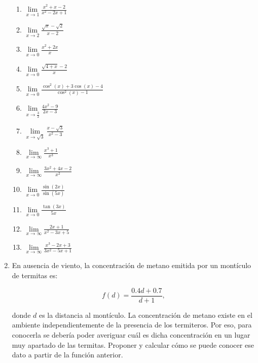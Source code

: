 \documentclass[12pt]{article}
\theoremstyle{definition}
\begin{document}
\begin{enumerate}
\begin{multicols}{3}
\begin{enumerate}
\item $\lim\limits_{x \to 1} \frac{x^2 + x - 2}{x^2 - 2x + 1}$
\item $\lim\limits_{x \to 2} \frac{\sqrt{x} - \sqrt{2}}{x - 2}$
\item $\lim\limits_{x \to 0} \frac{x^2 + 2x}{x}$
\item $\lim\limits_{x \to 0} \frac{\sqrt{4 + x} - 2}{x}$
\item $\lim\limits_{x \to 0} \frac{\cos^2(x) + 3\cos(x) - 4}{\cos^2(x) - 1}$
\item $\lim\limits_{x \to \frac{3}{2}} \frac{4x^2 - 9}{2x - 3}$
\item $\lim\limits_{x \to \sqrt{3}} \frac{x - \sqrt{3}}{x^2 - 3}$
\item $\lim\limits_{x \to \infty} \frac{x^3 + 1}{x^3}$
\item $\lim\limits_{x \to \infty} \frac{3x^2 + 4x - 2}{x^2}$
\item $\lim\limits_{x \to 0} \frac{\sin(2x)}{\sin(5x)}$
\item $\lim\limits_{x \to 0} \frac{\tan(3x)}{5x}$
\item $\lim\limits_{x \to \infty} \frac{2x + 1}{x^2 - 3x + 5}$
\item $\lim\limits_{x \to \infty} \frac{x^3 - 2x + 3}{3x^2 - 5x + 1}$
\end{enumerate}
\end{multicols}

\item En ausencia de viento, la concentración de metano emitida por un montículo de termitas es:

\[f(d) = \frac{0.4 d + 0.7}{d + 1},\]

donde $d$ es la distancia al montículo. La concentración de metano existe en el ambiente independientemente de la presencia de los termiteros. Por eso, para conocerla se debería poder averiguar cuál es dicha concentración en un lugar muy apartado de las termitas. Proponer y calcular cómo se puede conocer ese dato a partir de la función anterior.
\end{enumerate}
\end{document}
